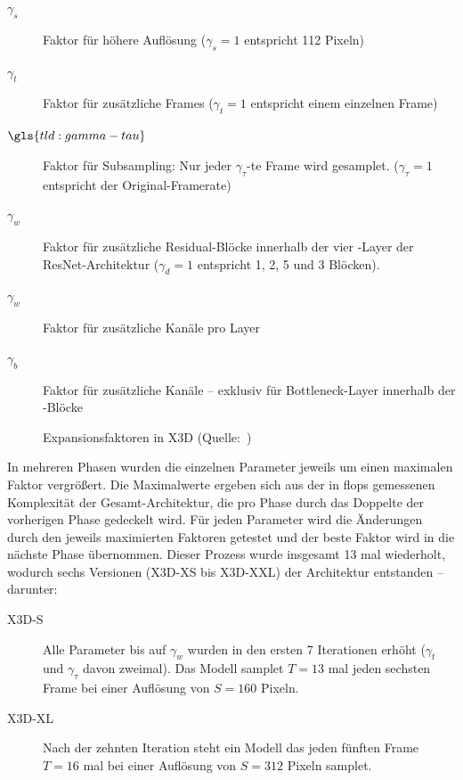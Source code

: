 \begin{description}
    \item[$\gamma_s$] Faktor für höhere Auflösung ($\gamma_s = 1$ entspricht 112 Pixeln)
    \item[$\gamma_t$] Faktor für zusätzliche Frames ($\gamma_t = 1$ entspricht einem einzelnen Frame)
    \item[$\gls{tld:gamma-tau}$] Faktor für Subsampling: Nur jeder $\gamma_\tau$-te Frame wird gesamplet. ($\gamma_\tau = 1$ entspricht der Original-Framerate)
    \item[$\gamma_w$] Faktor für zusätzliche Residual-Blöcke innerhalb der vier \res-Layer der ResNet-Architektur ($\gamma_d = 1$ entspricht 1, 2, 5 und 3 Blöcken).
    \item[$\gamma_w$] Faktor für zusätzliche Kanäle pro Layer
    \item[$\gamma_b$] Faktor für zusätzliche Kanäle -- exklusiv für Bottleneck-Layer innerhalb der \res-Blöcke
\end{description}

\begin{figure}[h!]
    \centering
    \caption{Expansionsfaktoren in X3D (Quelle:~\cite{Feichtenhofer20})}
    \label{fig:x3d}
\end{figure}

In mehreren Phasen wurden die einzelnen Parameter jeweils um einen maximalen Faktor vergrößert.
Die Maximalwerte ergeben sich aus der in \gls{flops} gemessenen Komplexität der Gesamt-Architektur, die pro Phase durch das Doppelte der vorherigen Phase gedeckelt wird.
Für jeden Parameter wird die Änderungen durch den jeweils maximierten Faktoren getestet und der beste Faktor wird in die nächste Phase übernommen.
Dieser Prozess wurde insgesamt 13 mal wiederholt, wodurch sechs Versionen (X3D-XS bis X3D-XXL) der Architektur entstanden -- darunter:

\begin{description}
    \item[X3D-S] Alle Parameter bis auf $\gamma_w$ wurden in den ersten 7 Iterationen erhöht ($\gamma_t$ und $\gamma_\tau$ davon zweimal).
    Das Modell samplet $T=13$ mal jeden sechsten Frame bei einer Auflösung von $S=160$ Pixeln.
    \item[X3D-XL] Nach der zehnten Iteration steht ein Modell das jeden fünften Frame $T=16$ mal bei einer Auflösung von $S=312$ Pixeln samplet.
\end{description}

